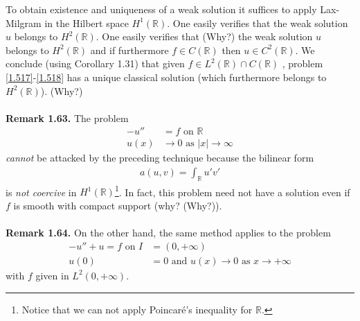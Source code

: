 \documentclass[a4paper,oneside]{book}
\numberwithin{equation}{chapter}
\begin{document}
To obtain existence and uniqueness of a weak solution it suffices to apply Lax-Milgram in the Hilbert space $H^1\left(\mathbb{R}\right)$. One easily verifies that the weak solution $u$ belongs to $H^2\left(\mathbb{R}\right)$. One easily verifies that (Why?) the weak solution $u$ belongs to $H^2\left(\mathbb{R}\right)$ and if furthermore $f\in C\left(\mathbb{R}\right)$ then $u\in C^2\left(\mathbb{R}\right)$. We conclude (using Corollary 1.31) that given $f \in {L^2}\left( \mathbb{R} \right) \cap C\left( \mathbb{R} \right)$ , problem \eqref{1.517}-\eqref{1.518} has a unique classical solution (which furthermore belongs to $H^2\left(\mathbb{R}\right)$). (Why?)\\
\\
\textbf{Remark 1.63.} The problem
\begin{align}
 - u'' &= f\mbox{ on } \mathbb{R}\\
u\left( x \right) &\to 0\mbox{ as } \left| x \right| \to \infty 
\end{align}
\textit{cannot} be attacked by the preceding technique because the bilinear form 
\begin{align}
a\left( {u,v} \right) = \int_{\mathbb{R}} {u'v'} 
\end{align}
is \textit{not coercive} in $H^1\left(\mathbb{R}\right)$\footnote{Notice that we can not apply Poincar\'{e}'s inequality for $\mathbb{R}$.}. In fact, this problem need not have a solution even if $f$ is smooth with compact support (why? (Why?)).\\
\\
\textbf{Remark 1.64.} On the other hand, the same method applies to the problem
\begin{align}
 - u'' + u = f\mbox{ on } I &= \left( {0, + \infty } \right)\\
u\left( 0 \right) &= 0\mbox{ and } u\left( x \right) \to 0\mbox{ as } x \to  + \infty 
\end{align}
with $f$ given in $L^2\left(0,+\infty\right)$.
\end{document}
